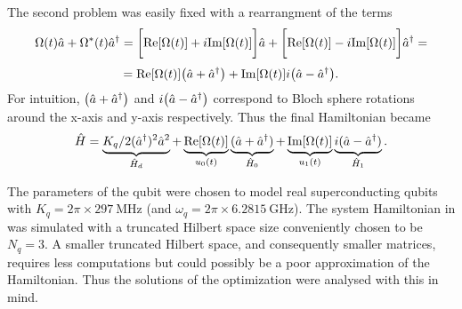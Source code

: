 \documentclass[main.tex]{subfiles}
\begin{document}
The second problem was easily fixed with a rearrangment of the terms
\[ \Omega(t)\hat{a} + \Omega^*(t)\hat{a}^\dagger = \bigg[\text{Re}\qty[\Omega(t)]+i\text{Im}\qty[\Omega(t)]\bigg]\hat{a} + \bigg[\text{Re}\qty[\Omega(t)]-i\text{Im}\qty[\Omega(t)]\bigg]\hat{a}^\dagger = \]
\[ = \text{Re}\qty[\Omega(t)]\qty(\hat{a} + \hat{a}^\dagger) + \text{Im}\qty[\Omega(t)]i\qty(\hat{a} - \hat{a}^\dagger). \]
For intuition, \( \qty(\hat{a} + \hat{a}^\dagger) \) and \( i\qty(\hat{a} - \hat{a}^\dagger) \) correspond to Bloch sphere rotations around the x-axis and y-axis respectively. 
Thus the final Hamiltonian became
\begin{equation}
    \hat{H} = \underbrace{K_q/2(\hat{a}^\dagger)^2\hat{a}^2}_{\hat{H}_d} + \underbrace{\text{Re}\qty[\Omega(t)]}_{u_0(t)}\underbrace{(\hat{a} + \hat{a}^\dagger)}_{\hat{H}_0} + \underbrace{\text{Im}\qty[\Omega(t)]}_{u_1(t)}\underbrace{i(\hat{a} - \hat{a}^\dagger)}_{\hat{H}_1} .
    \label{eq:system-hamiltonian-rotating}
\end{equation}

The parameters of the qubit were chosen to model real superconducting qubits with \( K_q = 2\pi\times\SI{297}{\mega\hertz} \) (and \( \omega_{q} = 2\pi\times\SI{6.2815}{\giga\hertz} \)).
The system Hamiltonian in  was simulated with a truncated Hilbert space size conveniently chosen to be \( N_q = 3 \).
A smaller truncated Hilbert space, and consequently smaller matrices, requires less computations but could possibly be a poor approximation of the Hamiltonian.
Thus the solutions of the optimization were analysed with this in mind.
\end{document}
